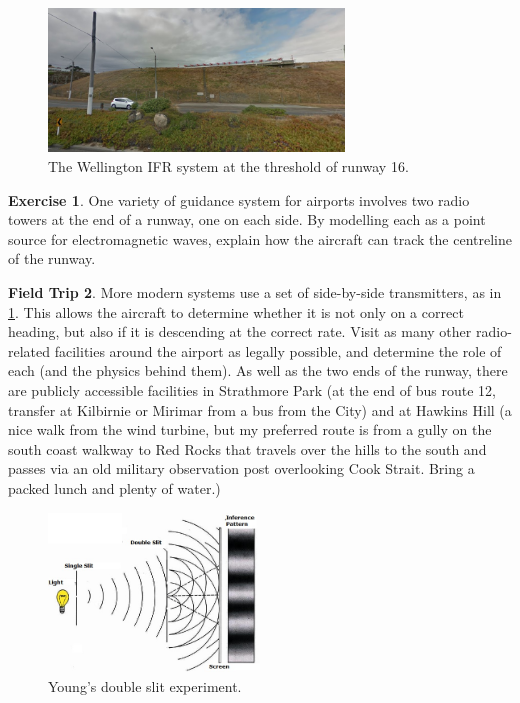 \documentclass[a4paper]{amsbook}
\theoremstyle{definition}
\newtheorem{exercise}{Exercise}
\numberwithin{exercise}{chapter}
\numberwithin{exercise}{chapter}
\newtheorem{trip}[exercise]{Field Trip}
\begin{document}
\begin{figure}
  \centering
  \includegraphics[width=0.7\textwidth]{localiser}
  \caption{The Wellington IFR system at the threshold of runway 16.}\label{fig:localiser}
\end{figure}
\begin{exercise}
  One variety of guidance system for airports involves two radio towers at the end of a runway, one on each side. By modelling
  each as a point source for electromagnetic waves, explain how the aircraft can track the centreline of the runway.
\end{exercise}

\begin{trip}
  More modern systems use a set of side-by-side transmitters, as in \cref{fig:localiser}. This allows the aircraft to determine whether
  it is not only on a correct heading, but also if it is descending at the correct rate. Visit as many other radio-related facilities around
  the airport as legally possible, and determine the role of each (and the physics behind them). As well as the two ends of the runway, there
  are publicly accessible facilities in Strathmore Park (at the end of bus route 12, transfer at Kilbirnie or Mirimar from a bus from the City)
  and at Hawkins Hill (a nice walk from the wind turbine, but my preferred route is from a gully on the south coast walkway to Red Rocks that
  travels over the hills to the south and passes via an old military observation post overlooking Cook Strait. Bring a packed lunch and plenty of water.)
\end{trip}

\begin{figure}
  \centering
  \includegraphics[width=0.5\textwidth]{doubleslit}
  \caption{Young's double slit experiment.}\label{fig:young}
\end{figure}
\end{document}
